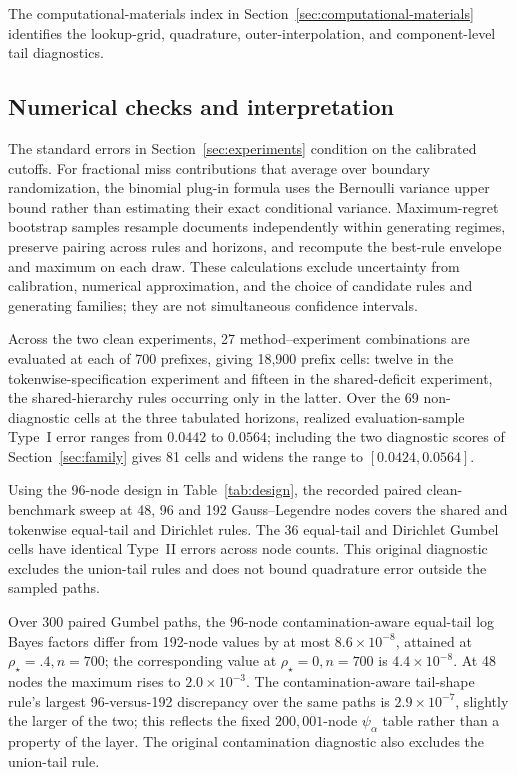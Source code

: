 \documentclass[11pt]{article}
\begin{document}
The computational-materials index in Section~\ref{sec:computational-materials} identifies the lookup-grid, quadrature, outer-interpolation, and component-level tail diagnostics.

\subsection{Numerical checks and interpretation}
\label{sec:numerical-checks}

The standard errors in Section~\ref{sec:experiments} condition on the calibrated
cutoffs.  For fractional miss contributions that average over boundary
randomization, the binomial plug-in formula uses the Bernoulli variance upper
bound rather than estimating their exact conditional variance.  Maximum-regret
bootstrap samples resample documents independently within generating regimes,
preserve pairing across rules and horizons, and recompute the best-rule envelope
and maximum on each draw.  These calculations exclude uncertainty from
calibration, numerical approximation, and the choice of candidate rules and
generating families; they are not simultaneous confidence intervals.

Across the two clean experiments, 27 method--experiment combinations are evaluated at each of 700 prefixes, giving 18{,}900 prefix cells: twelve in the tokenwise-specification experiment and fifteen in the shared-deficit experiment, the shared-hierarchy rules occurring only in the latter.  Over the 69 non-diagnostic cells at the three tabulated horizons, realized evaluation-sample Type~I error ranges from $0.0442$ to $0.0564$; including the two diagnostic scores of Section~\ref{sec:family} gives 81 cells and widens the range to $[0.0424,0.0564]$.

Using the 96-node design in Table~\ref{tab:design}, the recorded paired clean-benchmark sweep at 48, 96 and 192 Gauss--Legendre nodes covers the shared and tokenwise equal-tail and Dirichlet rules.  The 36 equal-tail and Dirichlet Gumbel cells have identical Type~II errors across node counts.  This original diagnostic excludes the union-tail rules and does not bound quadrature error outside the sampled paths.

Over 300 paired Gumbel paths, the 96-node contamination-aware equal-tail log Bayes factors differ from 192-node values by at most $8.6\times10^{-8}$, attained at $\rho_\star=.4,n=700$; the corresponding value at $\rho_\star=0,n=700$ is $4.4\times10^{-8}$.  At 48 nodes the maximum rises to $2.0\times10^{-3}$.  The contamination-aware tail-shape rule's largest 96-versus-192 discrepancy over the same paths is $2.9\times10^{-7}$, slightly the larger of the two; this reflects the fixed $200{,}001$-node $\psi_\alpha$ table rather than a property of the layer.  The original contamination diagnostic also excludes the union-tail rule.
\end{document}
